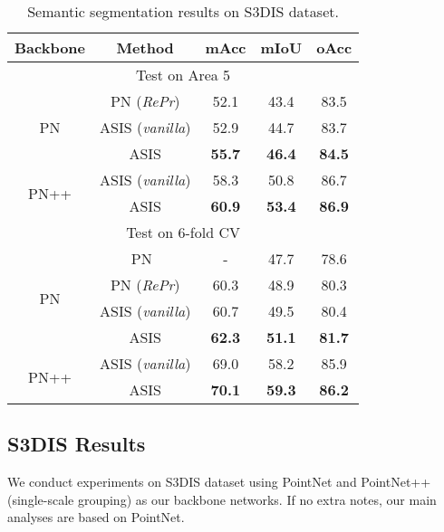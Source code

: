 \documentclass[10pt,twocolumn,letterpaper]{article}
\begin{document}
\begin{table}[!hbt]
\small 
\begin{center}
\begin{tabular}{c|c|c|c|c}
\hline
\hline
    Backbone & Method    & mAcc    & mIoU & oAcc   \\
\hline
\hline 
\multicolumn{5}{c}{Test on Area 5} \\
\hline
\multirow{3}{*}{PN} 
 & PN (\textit{RePr}) & 52.1   &  43.4 & 83.5 \\
 & ASIS (\textit{vanilla}) & 52.9 & 44.7 & 83.7 \\
 & ASIS &  {\bf 55.7} & {\bf 46.4} & {\bf 84.5} \\
\hline 
\multirow{2}{*}{PN++} 
 & ASIS (\textit{vanilla}) & 58.3 & 50.8 & 86.7 \\
 & ASIS &  {\bf 60.9} & {\bf 53.4} & {\bf 86.9} \\
\hline 
\hline 

\multicolumn{5}{c}{Test on 6-fold CV} \\
\hline
\multirow{4}{*}{PN} 
 & PN~\cite{Qi_2017_CVPR} &  -  & 47.7 & 78.6 \\
 & PN (\textit{RePr}) &  60.3  & 48.9  & 80.3 \\
 & ASIS (\textit{vanilla}) & 60.7 & 49.5 & 80.4 \\
 & ASIS &  {\bf 62.3} & {\bf 51.1} & {\bf 81.7} \\
 \hline
\multirow{2}{*}{PN++} 
 & ASIS (\textit{vanilla}) & 69.0 & 58.2 & 85.9 \\
 & ASIS &  {\bf 70.1} & {\bf 59.3} & {\bf 86.2} \\
\hline
\end{tabular}
\end{center}
\caption{Semantic segmentation results on S3DIS dataset.}
\label{tab:s3dis_sem_results}
\end{table}


\subsection{S3DIS Results}

We conduct experiments on S3DIS dataset using PointNet and PointNet++ (single-scale grouping) as our backbone networks.
If no extra notes, our main analyses are based on PointNet.
\end{document}
